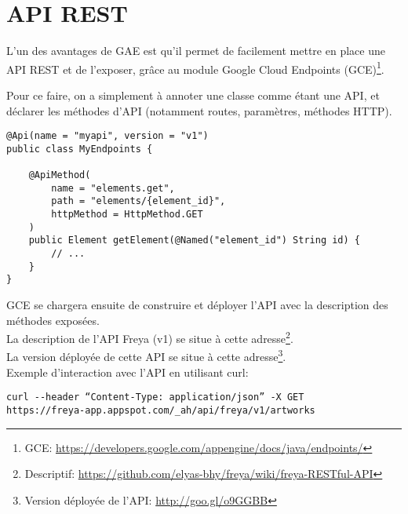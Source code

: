 \chapter{API REST}

L’un des avantages de GAE est qu’il permet de facilement mettre en place une API
REST et de l’exposer, grâce au module Google Cloud Endpoints
(GCE)\footnote{GCE:
\url{https://developers.google.com/appengine/docs/java/endpoints/}}.

Pour ce faire, on a simplement à annoter une classe comme étant une API, et
déclarer les méthodes d’API (notamment routes, paramètres, méthodes HTTP).\\

\begin{adjustbox}{minipage=1.02\textwidth,margin=0pt \smallskipamount,center}
\begin{lstlisting}[style=Java, label=endpoints, caption=Exemple d'API avec
Google Cloud Endpoints]
@Api(name = "myapi", version = "v1")
public class MyEndpoints {

	@ApiMethod(
	    name = "elements.get",
	    path = "elements/{element_id}",
	    httpMethod = HttpMethod.GET
	)
	public Element getElement(@Named("element_id") String id) {
	    // ...
	}
}
\end{lstlisting}
\end{adjustbox}


GCE se chargera ensuite de construire et déployer l’API avec la description des
méthodes exposées.\\
La description de l’API Freya (v1) se situe à cette
adresse\footnote{Descriptif:
\url{https://github.com/elyas-bhy/freya/wiki/freya-RESTful-API}}.\\
La version déployée de cette API se situe à cette adresse\footnote{Version
déployée de l'API: \url{http://goo.gl/o9GGBB}}.\\

Exemple d’interaction avec l’API en utilisant curl:
\begin{verbatim}
curl --header “Content-Type: application/json” -X GET
https://freya-app.appspot.com/_ah/api/freya/v1/artworks
\end{verbatim}
